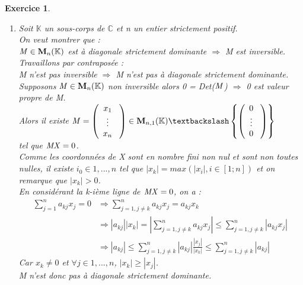 \documentclass[a4paper,11pt]{article}
\newtheorem{exo}{Exercice}
\newcommand{\abs}[1]{\left\lvert#1\right\rvert}
\begin{document}
\begin{exo}
\begin{enumerate}
\begin{figure}[h]
\end{figure}
En représentant graphiquement les disques de Gerschgörin de la matrice A avec ses valeurs propres dans le plan complexe sur Scilab (probleme3.sce > valeurs\_propres(A)), on peut voir et vérifier que ces valeurs propres (en l'occurrence ses 3 valeurs propres) sont bien toutes dans l'union des disques (voir figure ci-dessus).
\item
Soit $\mathbb{K}$ un sous-corps de $\mathbb{C}$ et {\it n} un entier strictement positif. \ \\
On veut montrer que : \ \\
${\it M} \in {\bf M}_n(\mathbb{K})$ est à diagonale strictement dominante ${\Rightarrow}$  {\it M} est inversible. \ \\
Travaillons par contrapos\'{e}e : \ \\
{\it M} n'est pas inversible ${\Rightarrow}$ {\it M} n'est pas à diagonale strictement dominante. \ \\
Supposons ${\it M} \in {\bf M}_n(\mathbb{K})$ non inversible alors 0 = Det(${\it M}$) ${\Rightarrow}$ 0 est valeur propre de {\it M}. \ \\
Alors il existe $ {\it M} = \left( \begin{array}{cccc}
    x_1 \ \\
    \vdots \ \\
    x_n \ \\
   \end{array} \right) \in  {\bf M}_{n,1}(\mathbb{K}) \textbackslash \left\{\left(    \begin{array}{cccc}
    0 \ \\
    \vdots \ \\
    0 \ \\
   \end{array} \right)\right\} $ \ \\
tel que ${\it MX} = 0$. \ \\
Comme les coordonnées de {\it X} sont en nombre fini non nul et sont non toutes nulles, il existe $i_0 \in 1,...,n$ tel que $\abs{x_{k}} = max(\abs{x_i}, i \in [1;n])$ et on remarque que $\abs{x_{k}} > 0$. \ \\
En considérant la k-ième ligne de ${\it MX} = 0$, on a : \ \\
\begin{equation}
\begin{aligned}
\sum\limits_{j=1}^n a_{kj}x_j = 0 & \Rightarrow \sum\limits_{j=1,j\neq k}^n a_{kj}x_j = a_{kj}x_{k} \ \\
& \Rightarrow \abs{a_{kj}}\abs{x_{k}} = \abs{\sum\limits_{j=1,j\neq k}^n a_{kj}x_j} \le \sum\limits_{j=1,j\neq k}^n \abs{a_{kj}x_j} \ \\
& \Rightarrow \abs{a_{kj}} \le \sum\limits_{j=1,j\neq k}^n \abs{a_{kj}}\frac{\abs{x_j}}{\abs{x_{k}}}  \le \sum\limits_{j=1,j\neq k}^n \abs{a_{kj}}
\end{aligned}
\end{equation}
Car $x_{k} \ne 0 $ et  $\forall j \in 1,...,n$, $\abs{x_{k}} \ge \abs{x_j}$. \ \\
{\it M} n'est donc pas à diagonale strictement dominante.
\end{enumerate}
\end{exo}

\end{document}

